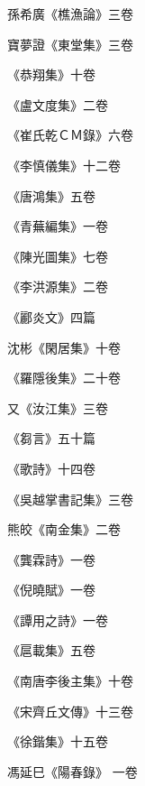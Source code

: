 \begin{pinyinscope}
 孫希廣《樵漁論》三卷



 寶夢證《東堂集》三卷



 《恭翔集》十卷



 《盧文度集》二卷



 《崔氏乾ＣＭ錄》六卷



 《李慎儀集》十二卷



 《唐鴻集》五卷



 《青蕪編集》一卷



 《陳光圖集》七卷



 《李洪源集》二卷



 《酈炎文》四篇



 沈彬《閑居集》十卷



 《羅隱後集》二十卷



 又《汝江集》三卷



 《芻言》五十篇



 《歌詩》十四卷



 《吳越掌書記集》三卷



 熊皎《南金集》二卷



 《龔霖詩》一卷



 《倪曉賦》一卷



 《譚用之詩》一卷



 《扈載集》五卷



 《南唐李後主集》十卷



 《宋齊丘文傳》十三卷



 《徐鍇集》十五卷



 馮延巳《陽春錄》
 一卷




\end{pinyinscope}
